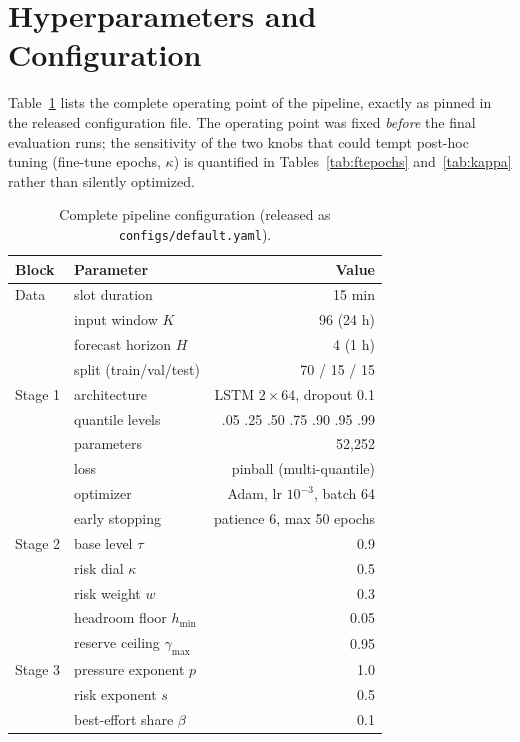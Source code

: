 \appendices

\section{Hyperparameters and Configuration}
\label{app:hyper}

Table~\ref{tab:hyper} lists the complete operating point of the
pipeline, exactly as pinned in the released configuration file. The
operating point was fixed \emph{before} the final evaluation runs;
the sensitivity of the two knobs that could tempt post-hoc tuning
(fine-tune epochs, $\kappa$) is quantified in
Tables~\ref{tab:ftepochs} and~\ref{tab:kappa} rather than silently
optimized.

\begin{table}[!t]
\caption{Complete pipeline configuration (released as
\texttt{configs/default.yaml}).}
\label{tab:hyper}
\centering
\small
\setlength{\tabcolsep}{4pt}
\begin{tabular}{@{}llr@{}}
\toprule
Block & Parameter & Value \\
\midrule
Data & slot duration & 15 min \\
     & input window $K$ & 96 (24 h) \\
     & forecast horizon $H$ & 4 (1 h) \\
     & split (train/val/test) & 70 / 15 / 15 \\
\midrule
Stage 1 & architecture & LSTM $2 \times 64$, dropout 0.1 \\
        & quantile levels & .05 .25 .50 .75 .90 .95 .99 \\
        & parameters & 52{,}252 \\
        & loss & pinball (multi-quantile) \\
        & optimizer & Adam, lr $10^{-3}$, batch 64 \\
        & early stopping & patience 6, max 50 epochs \\
\midrule
Stage 2 & base level $\tau$ & 0.9 \\
        & risk dial $\kappa$ & 0.5 \\
        & risk weight $w$ & 0.3 \\
        & headroom floor $h_{\min}$ & 0.05 \\
        & reserve ceiling $\gamma_{\max}$ & 0.95 \\
\midrule
Stage 3 & pressure exponent $p$ & 1.0 \\
        & risk exponent $s$ & 0.5 \\
        & best-effort share $\beta$ & 0.1 \\

\end{tabular}
\end{table}
